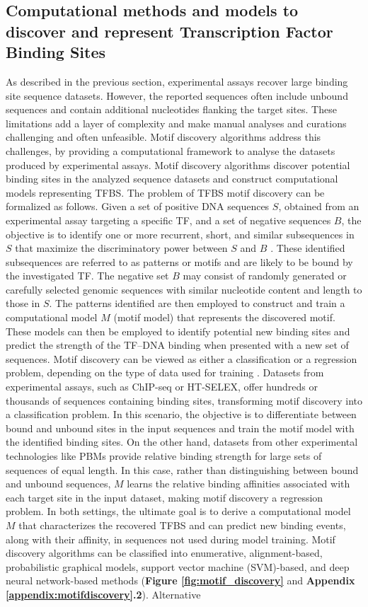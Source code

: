 \documentclass[a4paper, titlepage, openright]{book}
\begin{document}
\subsection{Computational methods and models to discover and represent Transcription Factor Binding Sites}
As described in the previous section, experimental assays recover large binding site sequence datasets. However, the reported sequences often include unbound sequences and contain additional nucleotides flanking the target sites. These limitations add a layer of complexity and make manual analyses and curations challenging and often unfeasible. Motif discovery algorithms address this challenges, by providing a computational framework to analyse the datasets produced by experimental assays. Motif discovery algorithms discover potential binding sites in the analyzed sequence datasets and construct computational models representing TFBS. The problem of TFBS motif discovery can be formalized as follows. Given a set of positive DNA sequences $S$, obtained from an experimental assay targeting a specific TF, and a set of negative sequences $B$, the objective is to identify one or more recurrent, short, and similar subsequences in $S$ that maximize the discriminatory power between $S$ and $B$ \citep{tognon2023survey}. These identified subsequences are referred to as patterns or motifs and are likely to be bound by the investigated TF. The negative set $B$ may consist of randomly generated or carefully selected genomic sequences with similar nucleotide content and length to those in $S$. The patterns identified are then employed to construct and train a computational model $M$ (motif model) that represents the discovered motif. These models can then be employed to identify potential new binding sites and predict the strength of the TF–DNA binding when presented with a new set of sequences. Motif discovery can be viewed as either a classification or a regression problem, depending on the type of data used for training \citep{tognon2023survey}. Datasets from experimental assays, such as ChIP-seq or HT-SELEX, offer hundreds or thousands of sequences containing binding sites, transforming motif discovery into a classification problem. In this scenario, the objective is to differentiate between bound and unbound sites in the input sequences and train the motif model with the identified binding sites. On the other hand, datasets from other experimental technologies like PBMs provide relative binding strength for large sets of sequences of equal length. In this case, rather than distinguishing between bound and unbound sequences, $M$ learns the relative binding affinities associated with each target site in the input dataset, making motif discovery a regression problem. In both settings, the ultimate goal is to derive a computational model $M$ that characterizes the recovered TFBS and can predict new binding events, along with their affinity, in sequences not used during model training. Motif discovery algorithms can be classified into enumerative, alignment-based, probabilistic graphical models, support vector machine (SVM)-based, and deep neural network-based methods (\textbf{Figure \ref{fig:motif_discovery}} and \textbf{Appendix \ref{appendix:motifdiscovery}.2}). Alternative 
\end{document}
